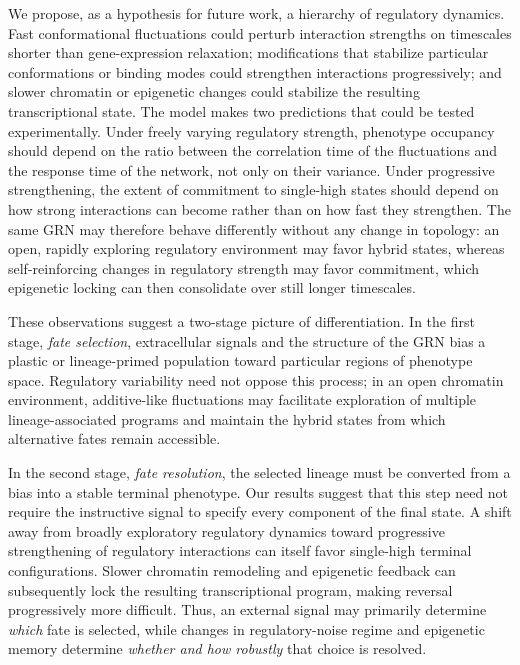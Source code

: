 \documentclass[11pt]{article}
\begin{document}
We propose, as a hypothesis for future work, a hierarchy of regulatory dynamics. Fast conformational fluctuations could perturb interaction strengths on timescales shorter than gene-expression relaxation; modifications that stabilize particular conformations or binding modes could strengthen interactions progressively; and slower chromatin or epigenetic changes could stabilize the resulting transcriptional state. The model makes two predictions that could be tested experimentally. Under freely varying regulatory strength, phenotype occupancy should depend on the ratio between the correlation time of the fluctuations and the response time of the network, not only on their variance. Under progressive strengthening, the extent of commitment to single-high states should depend on how strong interactions can become rather than on how fast they strengthen. The same GRN may therefore behave differently without any change in topology: an open, rapidly exploring regulatory environment may favor hybrid states, whereas self-reinforcing changes in regulatory strength may favor commitment, which epigenetic locking can then consolidate over still longer timescales.

These observations suggest a two-stage picture of differentiation. In the first stage, \emph{fate selection}, extracellular signals and the structure of the GRN bias a plastic or lineage-primed population toward particular regions of phenotype space. Regulatory variability need not oppose this process; in an open chromatin environment, additive-like fluctuations may facilitate exploration of multiple lineage-associated programs and maintain the hybrid states from which alternative fates remain accessible.

In the second stage, \emph{fate resolution}, the selected lineage must be converted from a bias into a stable terminal phenotype. Our results suggest that this step need not require the instructive signal to specify every component of the final state. A shift away from broadly exploratory regulatory dynamics toward progressive strengthening of regulatory interactions can itself favor single-high terminal configurations. Slower chromatin remodeling and epigenetic feedback can subsequently lock the resulting transcriptional program, making reversal progressively more difficult. Thus, an external signal may primarily determine \emph{which} fate is selected, while changes in regulatory-noise regime and epigenetic memory determine \emph{whether and how robustly} that choice is resolved.
\end{document}
